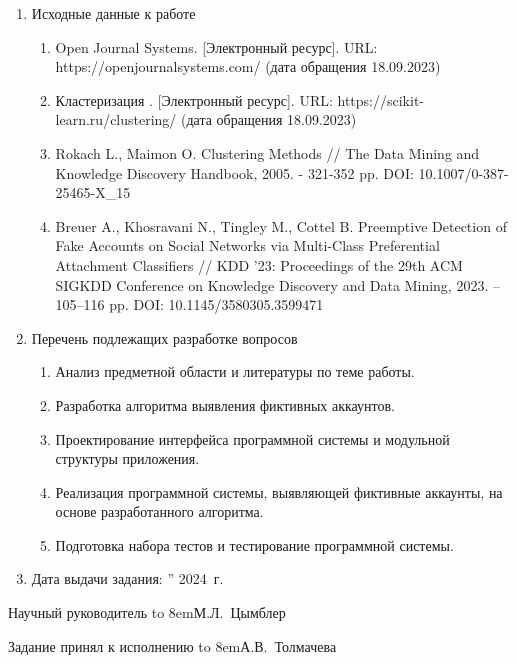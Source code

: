 \begin{adjustwidth}{-1.5cm}{0.5cm}
\begin{linespread}{1}
{\begin{enumerate}
	\bf\item Исходные данные к работе\rm
	\begin{enumerate}%
		\raggedright
		\item Open Journal Systems. [Электронный ресурс]. URL: https://openjournalsystems.com/ (дата обращения 18.09.2023)

		\item Кластеризация . [Электронный ресурс]. URL: https://scikit-learn.ru/clustering/ (дата обращения 18.09.2023)

  		\item Rokach L., Maimon O. Clustering Methods // The Data Mining and Knowledge Discovery Handbook, 2005. - 321-352 pp. DOI: 10.1007/0-387-25465-X\_15

		\item Breuer A., Khosravani N., Tingley M., Cottel B. Preemptive Detection of Fake Accounts on Social Networks via Multi-Class Preferential Attachment Classifiers // KDD '23: Proceedings of the 29th ACM SIGKDD Conference on Knowledge Discovery and Data Mining, 2023. – 105–116 pp. DOI: 10.1145/3580305.3599471

	\end{enumerate}

	\bf\item Перечень подлежащих разработке вопросов\rm
	\begin{enumerate}
		\item Анализ предметной области и литературы по теме работы.
		\item Разработка алгоритма выявления фиктивных аккаунтов.
		\item Проектирование интерфейса программной системы и модульной структуры приложения.
		\item Реализация программной системы, выявляющей фиктивные аккаунты, на основе разработанного алгоритма.
            \item Подготовка набора тестов и тестирование программной системы.
	\end{enumerate}

	\bf\item Дата выдачи задания: \rm
	\underline{\qquad}''\underfield{} 2024~г.
\end{enumerate}

\vspace{1em}

\noindent
{Научный руководитель}
\hfill
\hbox to 8em{М.Л.~Цымблер\hfill}

\vspace{1em}

\noindent
{Задание принял к исполнению}
\hfill
\hbox to 8em{А.В.~Толмачева\hfill}

}

\thispagestyle{empty}

\end{linespread}
\end{adjustwidth}

\pagebreak

